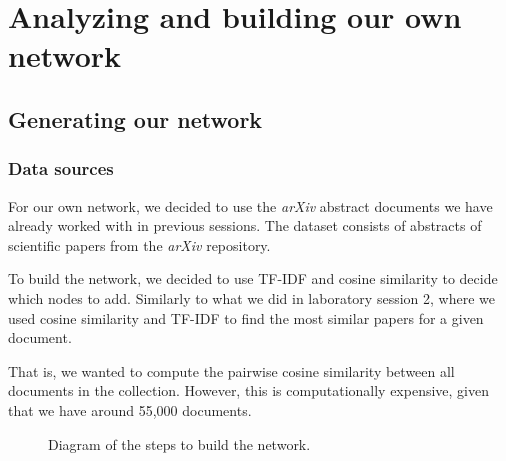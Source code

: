 \section{Analyzing and building our own network}

\subsection{Generating our network}

\subsubsection{Data sources}

For our own network, we decided to use the \emph{arXiv} abstract documents we have already
worked with in previous sessions. The dataset consists of abstracts of scientific papers
from the \emph{arXiv} repository.

To build the network, we decided to use TF-IDF and cosine similarity to decide which
nodes to add. Similarly to what we did in laboratory session 2, where we used
cosine similarity and TF-IDF to find the most similar papers for a given document.

That is, we wanted to compute the pairwise cosine similarity between all documents in the
collection. However, this is computationally expensive, given that we have around 55,000 documents.

\begin{figure}[H]
	\caption{Diagram of the steps to build the network.}
\end{figure}

